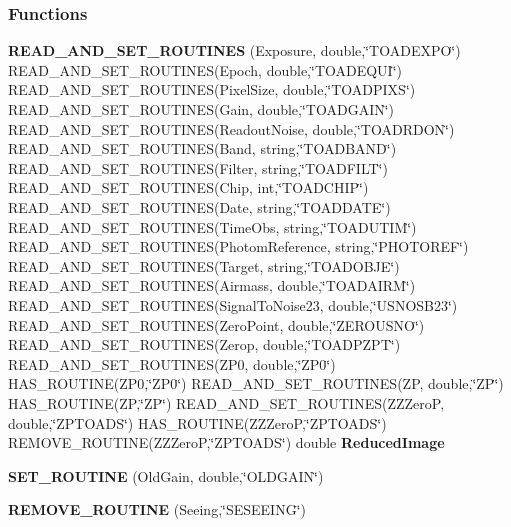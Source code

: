 \subsubsection*{Functions}
\begin{CompactItemize}
\item 
{}
{\bf READ\_\-AND\_\-SET\_\-ROUTINES} (Exposure, double,\char`\"{}TOADEXPO\char`\"{}) READ\_\-AND\_\-SET\_\-ROUTINES(Epoch, double,\char`\"{}TOADEQUI\char`\"{}) READ\_\-AND\_\-SET\_\-ROUTINES(Pixel\-Size, double,\char`\"{}TOADPIXS\char`\"{}) READ\_\-AND\_\-SET\_\-ROUTINES(Gain, double,\char`\"{}TOADGAIN\char`\"{}) READ\_\-AND\_\-SET\_\-ROUTINES(Readout\-Noise, double,\char`\"{}TOADRDON\char`\"{}) READ\_\-AND\_\-SET\_\-ROUTINES(Band, string,\char`\"{}TOADBAND\char`\"{}) READ\_\-AND\_\-SET\_\-ROUTINES(Filter, string,\char`\"{}TOADFILT\char`\"{}) READ\_\-AND\_\-SET\_\-ROUTINES(Chip, int,\char`\"{}TOADCHIP\char`\"{}) READ\_\-AND\_\-SET\_\-ROUTINES(Date, string,\char`\"{}TOADDATE\char`\"{}) READ\_\-AND\_\-SET\_\-ROUTINES(Time\-Obs, string,\char`\"{}TOADUTIM\char`\"{}) READ\_\-AND\_\-SET\_\-ROUTINES(Photom\-Reference, string,\char`\"{}PHOTOREF\char`\"{}) READ\_\-AND\_\-SET\_\-ROUTINES(Target, string,\char`\"{}TOADOBJE\char`\"{}) READ\_\-AND\_\-SET\_\-ROUTINES(Airmass, double,\char`\"{}TOADAIRM\char`\"{}) READ\_\-AND\_\-SET\_\-ROUTINES(Signal\-To\-Noise23, double,\char`\"{}USNOSB23\char`\"{}) READ\_\-AND\_\-SET\_\-ROUTINES(Zero\-Point, double,\char`\"{}ZEROUSNO\char`\"{}) READ\_\-AND\_\-SET\_\-ROUTINES(Zerop, double,\char`\"{}TOADPZPT\char`\"{}) READ\_\-AND\_\-SET\_\-ROUTINES(ZP0, double,\char`\"{}ZP0\char`\"{}) HAS\_\-ROUTINE(ZP0,\char`\"{}ZP0\char`\"{}) READ\_\-AND\_\-SET\_\-ROUTINES(ZP, double,\char`\"{}ZP\char`\"{}) HAS\_\-ROUTINE(ZP,\char`\"{}ZP\char`\"{}) READ\_\-AND\_\-SET\_\-ROUTINES(ZZZero\-P, double,\char`\"{}ZPTOADS\char`\"{}) HAS\_\-ROUTINE(ZZZero\-P,\char`\"{}ZPTOADS\char`\"{}) REMOVE\_\-ROUTINE(ZZZero\-P,\char`\"{}ZPTOADS\char`\"{}) double {\bf Reduced\-Image}\label{reducedimage_cc_a8}

\item 
{}
{\bf SET\_\-ROUTINE} (Old\-Gain, double,\char`\"{}OLDGAIN\char`\"{})\label{reducedimage_cc_a9}

\item 
{}
{\bf REMOVE\_\-ROUTINE} (Seeing,\char`\"{}SESEEING\char`\"{})\label{reducedimage_cc_a10}


\end{CompactItemize}
